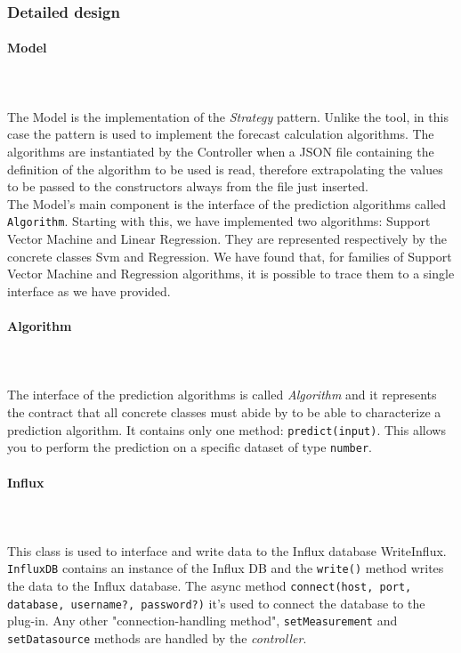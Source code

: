 \subsubsection{Detailed design}
\paragraph{Model}\mbox{} \\ \mbox{} \\
The Model is the implementation of the \textit{Strategy} pattern. Unlike the tool, in this case the pattern is used to implement the forecast calculation algorithms.
The algorithms are instantiated by the Controller when a JSON file containing the definition of the algorithm to be used is read, therefore extrapolating the values to be passed to the constructors always from the file just inserted.\\
The Model's main component is the interface of the prediction algorithms
called \texttt{Algorithm}. Starting with this, we have implemented
two algorithms: Support Vector Machine and Linear Regression.
They are represented respectively by the concrete classes Svm and Regression. We have found that, for families of Support Vector Machine and Regression algorithms, it is possible to trace them to a single interface as we have provided.

\paragraph*{Algorithm}\mbox{} \\ \mbox{} \\
The interface of the prediction algorithms is called \textit{Algorithm} and it
represents the contract that all concrete classes must abide by
to be able to characterize a prediction algorithm. It contains only one method:
\texttt{predict(input)}. This allows you to perform the prediction on a specific dataset of type \texttt{number}.

\paragraph*{Influx}\mbox{} \\ \mbox{} \\
This class is used to interface and write data to the Influx database WriteInflux. \texttt{InfluxDB} contains an instance of the Influx DB and the \texttt{write()} method writes the data to the Influx database. The async method \texttt{connect(host, port, database, username?, password?)} it's used to connect the database to the plug-in. Any other "connection-handling method", \texttt{setMeasurement} and \texttt{setDatasource} methods are handled by the \textit{controller}.

